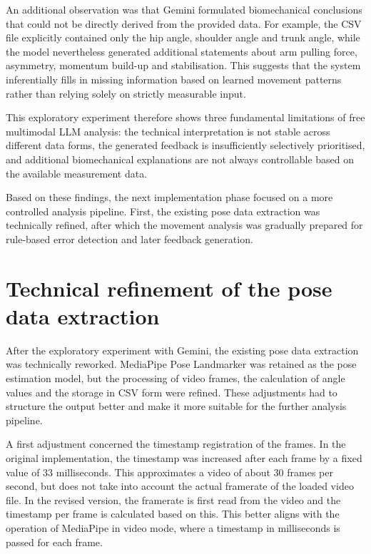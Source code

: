 An additional observation was that Gemini formulated biomechanical conclusions that could not be directly derived from the provided data. For example, the CSV file explicitly contained only the hip angle, shoulder angle and trunk angle, while the model nevertheless generated additional statements about arm pulling force, asymmetry, momentum build-up and stabilisation. This suggests that the system inferentially fills in missing information based on learned movement patterns rather than relying solely on strictly measurable input.

This exploratory experiment therefore shows three fundamental limitations of free multimodal LLM analysis: the technical interpretation is not stable across different data forms, the generated feedback is insufficiently selectively prioritised, and additional biomechanical explanations are not always controllable based on the available measurement data.

Based on these findings, the next implementation phase focused on a more controlled analysis pipeline. First, the existing pose data extraction was technically refined, after which the movement analysis was gradually prepared for rule-based error detection and later feedback generation.

\section{Technical refinement of the pose data extraction}

After the exploratory experiment with Gemini, the existing pose data extraction was technically reworked. MediaPipe Pose Landmarker was retained as the pose estimation model, but the processing of video frames, the calculation of angle values and the storage in CSV form were refined. These adjustments had to structure the output better and make it more suitable for the further analysis pipeline.

A first adjustment concerned the timestamp registration of the frames. In the original implementation, the timestamp was increased after each frame by a fixed value of 33 milliseconds. This approximates a video of about 30 frames per second, but does not take into account the actual framerate of the loaded video file. In the revised version, the framerate is first read from the video and the timestamp per frame is calculated based on this. This better aligns with the operation of MediaPipe in video mode, where a timestamp in milliseconds is passed for each frame.

